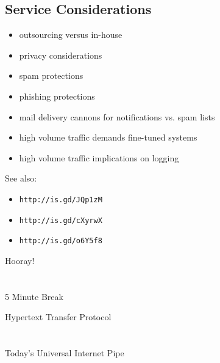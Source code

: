 \documentclass[xga]{xdvislides}
\begin{document}
\subsection{Service Considerations}
\begin{itemize}
	\item outsourcing versus in-house
	\item privacy considerations
	\item spam protections
	\item phishing protections
	\item mail delivery cannons for notifications vs. spam lists
	\item high volume traffic demands fine-tuned systems
	\item high volume traffic implications on logging
\end{itemize}
\vspace{.5in}
See also:
\begin{itemize}
	\item {\tt http://is.gd/JQp1zM}
	\item {\tt http://is.gd/cXyrwX}
	\item {\tt http://is.gd/o6Y5f8}
\end{itemize}

\newpage
\vspace*{\fill}
\begin{center}
    \Hugesize
        Hooray! \\ [1em]
    \hspace*{5mm}
    \blueline\\
    \hspace*{5mm}\\
        5 Minute Break
\end{center}
\vspace*{\fill}

\newpage
\vspace*{\fill}
\begin{center}
	\Hugesize
		Hypertext Transfer Protocol\\ [1em]
	\hspace*{5mm}
	\blueline\\
	\hspace*{5mm}\\
		Today's Universal Internet Pipe
\end{center}
\vspace*{\fill}

%
%
%
\end{document}
